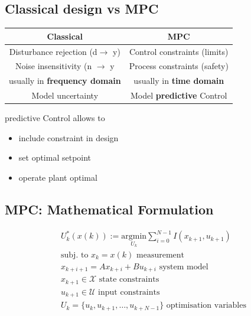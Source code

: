 \subsection{Classical design vs MPC}
\begin{center}
\begin{tabular}{|c|c|}
     \hline
    \textbf{Classical} & \textbf{MPC} \\
    \hline
    Disturbance rejection (d$\rightarrow$ y) & Control constraints (limits)
    \\
    \hline
    Noise insensitivity (n $\rightarrow$ y & Process constraints (safety) \\
    \hline
    usually in \textbf{frequency domain} & usually in \textbf{time domain} \\ \hline
    Model uncertainty & Model \textbf{predictive} Control\\ \hline
\end{tabular}
\end{center}
predictive Control allows to \begin{itemize}
    \item include constraint in design
    \item set optimal setpoint
    \item operate plant optimal
\end{itemize}

\subsection{MPC: Mathematical Formulation}
\begin{gather*}
    U^*_k(x(k)) := \underset{U_k}{\mathrm{argmin}}\sum^{N-1}_{i=0}I(x_{k+1},u_{k+1}) \\
    \textrm{subj. to } x_k = x(k) \textrm{ measurement} \\
    x_{k+i+1}= Ax_{k+i}+ Bu_{k+i} \textrm{ system model}
    \\
    x_{k+1} \in \mathcal{X} \textrm{ state constraints}\\
    u_{k+1} \in \mathcal{U} \textrm{ input constraints}\\
    U_k = \{u_k,u_{k+1}, \dots, u_{k+N-1}\} \textrm{ optimisation variables}
    \end{gather*}



